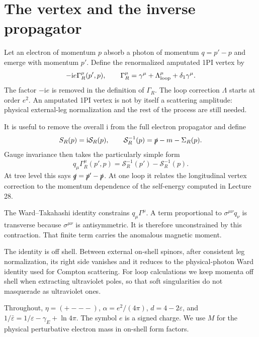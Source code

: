\documentclass[11pt]{article}
\newcommand{\ii}{\mathrm i}
\newcommand{\eps}{\varepsilon}
\begin{document}
\section{The vertex and the inverse propagator}
Let an electron of momentum \(p\) absorb a photon of momentum
\(q=p'-p\) and emerge with momentum \(p'\). Define the renormalized
amputated 1PI vertex by
\begin{equation}
 -\ii e\Gamma_R^\mu(p',p),\qquad
 \Gamma_R^\mu=\gamma^\mu+\Lambda^\mu_{\rm loop}+\delta_1\gamma^\mu.
\end{equation}
The factor \(-\ii e\) is removed in the definition of \(\Gamma_R\).
The loop correction \(\Lambda\) starts at order \(e^2\).
An amputated 1PI vertex is not by itself a scattering amplitude: physical
external-leg normalization and the rest of the process are still needed.

It is useful to remove the overall \(\ii\) from the full electron
propagator and define
\begin{equation}
 S_R(p)=\ii\mathcal S_R(p),\qquad
 \mathcal S_R^{-1}(p)=\slashed p-m-\Sigma_R(p).
\end{equation}
Gauge invariance then takes the particularly simple form
\begin{equation}
 \boxed{q_\mu\Gamma_R^\mu(p',p)
 =\mathcal S_R^{-1}(p')-\mathcal S_R^{-1}(p).}
 \label{eq:WT}
\end{equation}
At tree level this says \(\slashed q=\slashed p'-\slashed p\).
At one loop it relates the longitudinal vertex correction to the
momentum dependence of the self-energy computed in Lecture 28.

\begin{keyidea}
The Ward--Takahashi identity constrains \(q_\mu\Gamma^\mu\).
A term proportional to \(\sigma^{\mu\nu}q_\nu\) is transverse because
\(\sigma^{\mu\nu}\) is antisymmetric. It is therefore unconstrained by
this contraction. That finite term carries the anomalous magnetic moment.
\end{keyidea}
The identity is off shell. Between external on-shell spinors, after
consistent leg normalization, its right side vanishes and it reduces to
the physical-photon Ward identity used for Compton scattering.
For loop calculations we keep momenta off shell when extracting
ultraviolet poles, so that soft singularities do not masquerade as
ultraviolet ones.

Throughout, \(\eta=(+---)\), \(\alpha=e^2/(4\pi)\),
\(d=4-2\eps\), and \(1/\bar\eps=1/\eps-\gamma_E+\ln4\pi\).
The symbol \(e\) is a signed charge. We use \(M\) for the physical
perturbative electron mass in on-shell form factors.
\end{document}
